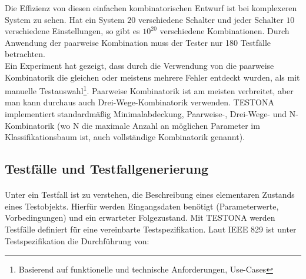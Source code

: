 
Die Effizienz von diesen einfachen kombinatorischen Entwurf ist bei komplexeren System zu sehen. Hat ein System $20$ verschiedene Schalter und jeder Schalter $10$ verschiedene Einstellungen, so gibt es $10^{20}$ verschiedene Kombinationen. Durch Anwendung der paarweise Kombination muss der Tester nur 180 Testfälle betrachten.\\

Ein Experiment hat gezeigt, dass durch die Verwendung von die paarweise Kombinatorik die gleichen oder meistens mehrere Fehler entdeckt wurden, als mit manuelle Testauswahl\footnote{Basierend auf funktionelle und technische Anforderungen, Use-Cases}. Paarweise Kombinatorik ist am meisten verbreitet, aber man kann durchaus auch Drei-Wege-Kombinatorik verwenden. TESTONA implementiert standardmäßig Minimalabdeckung, Paarweise-, Drei-Wege- und N-Kombinatorik (wo N die maximale Anzahl an möglichen Parameter im Klassifikationsbaum ist, auch vollständige Kombinatorik genannt)\cite{CombinatorialSoftTesting}.\\




\subsection{Testfälle und Testfallgenerierung}
\paragraph{}



Unter ein Testfall ist zu verstehen, die Beschreibung eines elementaren Zustands eines Testobjekts. Hierfür werden Eingangsdaten benötigt (Parameterwerte, Vorbedingungen) und ein erwarteter Folgezustand. Mit TESTONA werden Testfälle definiert für eine vereinbarte Testspezifikation. Laut IEEE 829 ist unter Testspezifikation die Durchführung von:


